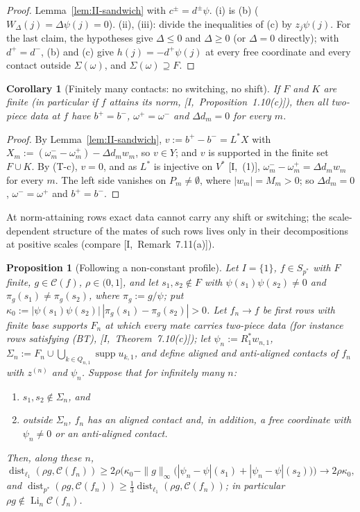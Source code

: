 \documentclass[10pt]{amsart}
\newtheorem{proposition}[theorem]{Proposition}
\newtheorem{corollary}[theorem]{Corollary}
\theoremstyle{definition}
\theoremstyle{remark}
\newcommand{\supp}{\operatorname{supp}}
\newcommand{\dist}{\operatorname{dist}}
\newcommand{\Cset}{\mathcal C}
\newcommand{\Li}{\operatorname*{Li}}
\begin{document}
\begin{proof}
Lemma~\ref{lem:II-sandwich} with $c^\pm=d^\pm\psi$.  (i) is (b) ($W_\Delta(j)=
\Delta\psi(j)=0$).  (ii), (iii): divide the inequalities of (c) by $z_j\psi(j)$.
For the last claim, the hypotheses give $\Delta\le0$ and $\Delta\ge0$
(or $\Delta=0$ directly); with $d^+=d^-$, (b) and (c) give $h(j)=-d^+\psi(j)$
at every free coordinate and every contact outside $\Sigma(\omega)$, and
$\Sigma(\omega)\supseteq F$.
\end{proof}

\begin{corollary}[Finitely many contacts: no switching, no shift]\label{cor:II-S2}
If $F$ and $K$ are finite \textup{(}in particular if $f$ attains its norm,
[I,~Proposition~1.10(c)]\textup{)}, then all two-piece data at $f$ have
$b^+=b^-$, $\omega^+=\omega^-$ and $\Delta d_m=0$ for every $m$.
\end{corollary}

\begin{proof}
By Lemma~\ref{lem:II-sandwich}, $v:=b^+-b^-=L^*X$ with $X_m:=(\omega^-_m-
\omega^+_m)-\Delta d_mw_m$, so $v\in Y$; and $v$ is supported in the finite
set $F\cup K$.  By (T-c), $v=0$, and as $L^*$ is injective on $V^*$
[I,~(1)], $\omega^-_m-\omega^+_m=\Delta d_mw_m$ for every $m$.  The left side
vanishes on $P_m\ne\emptyset$, where $|w_m|=M_m>0$; so $\Delta d_m=0$,
$\omega^-=\omega^+$ and $b^+=b^-$.
\end{proof}

At norm-attaining rows exact data cannot carry any shift or switching; the
scale-dependent structure of the mates of such rows lives only in their
decompositions at positive scales (compare [I,~Remark~7.11(a)]).

\begin{proposition}[Following a non-constant profile]\label{prop:II-S3}
Let $I=\{1\}$, $f\in S_{p^*}$ with $F$ finite, $g\in\Cset(f)$, $\rho\in(0,1]$,
and let $s_1,s_2\notin F$ with $\psi(s_1)\psi(s_2)\ne0$ and $\pi_g(s_1)\ne
\pi_g(s_2)$, where $\pi_g:=g/\psi$; put $\kappa_0:=|\psi(s_1)\psi(s_2)|\,
|\pi_g(s_1)-\pi_g(s_2)|>0$.  Let $f_n\to f$ be first rows with finite base
supports $F_n$ at which every mate carries two-piece data \textup{(}for
instance rows satisfying \textup{(BT)}, [I,~Theorem~7.10(c)]\textup{)}; let
$\psi_n:=R_1^*w_{n,1}$, $\Sigma_n:=F_n\cup\bigcup_{k\in Q_{n,1}}\supp u_{k,1}$,
and define aligned and anti-aligned contacts of $f_n$ with $z^{(n)}$ and
$\psi_n$.  Suppose that for infinitely many $n$:
\begin{enumerate}
\item[(1)] $s_1,s_2\notin\Sigma_n$, and
\item[(2)] outside $\Sigma_n$, $f_n$ has an aligned contact and, in addition,
a free coordinate with $\psi_n\ne0$ or an anti-aligned contact.
\end{enumerate}
Then, along these $n$,
\[
 \dist_{\ell_1}(\rho g,\Cset(f_n))\ge2\rho\Big(\kappa_0-\|g\|_\infty
 \big(|\psi_n-\psi|(s_1)+|\psi_n-\psi|(s_2)\big)\Big)\longrightarrow
 2\rho\kappa_0,
\]
and $\dist_{p^*}(\rho g,\Cset(f_n))\ge\frac13\dist_{\ell_1}(\rho g,\Cset(f_n))$;
in particular $\rho g\notin\Li_n\Cset(f_n)$.
\end{proposition}
\end{document}
